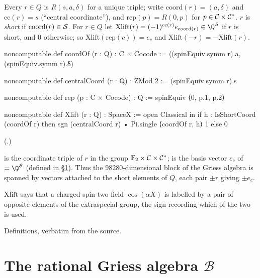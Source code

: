 \begin{definition}\label{ch21:def:Xlift}
Every $r\in Q$ is $R(s,a,\delta)$ for a unique triple; write $\mathrm{coord}(r)=(a,\delta)$ and
$\mathrm{cc}(r)=s$ (``central coordinate''), and $\mathrm{rep}(p)=R(0,p)$ for $p\in\mathcal{C}\times\mathcal{C}^*$.
$r$ is \emph{short} if $\mathrm{coord}(r)\in\mathcal{S}$.  For $r\in Q$ let
$\mathrm{Xlift}(r)=(-1)^{\mathrm{cc}(r)}e_{\mathrm{coord}(r)}\in\Q^{\chXXIS}$ if $r$ is short, and $0$
otherwise; so $\mathrm{Xlift}(\mathrm{rep}(c))=e_c$ and $\mathrm{Xlift}(-r)=-\mathrm{Xlift}(r)$.
\end{definition}
\begin{leancode}
noncomputable def coordOf (r : Q) : C × Cocode :=
  ((spinEquiv.symm r).a, (spinEquiv.symm r).δ)

noncomputable def centralCoord (r : Q) : ZMod 2 := (spinEquiv.symm r).s
\end{leancode}
\begin{leancode}
noncomputable def rep (p : C × Cocode) : Q := spinEquiv ⟨0, p.1, p.2⟩
\end{leancode}
\begin{leancode}
noncomputable def Xlift (r : Q) : SpaceX :=
  open Classical in
  if h : IsShortCoord (coordOf r) then sgn (centralCoord r) • Pi.single ⟨coordOf r, h⟩ 1 else 0
\end{leancode}
(.)
\begin{dictionary}
 is the coordinate triple of $r$ in the group
$\mathbb{F}_2\times\mathcal{C}\times\mathcal{C}^*$;  is the basis vector $e_c$ of
 $=\Q^{\chXXIS}$ (defined in \S\ref{ch21:sec:spaceB}).  Thus the $98280$-dimensional
block of the Griess algebra is spanned by vectors attached to the short elements of $Q$, each pair
$\pm r$ giving $\pm e_c$.
\end{dictionary}
\begin{physics}
$\mathrm{Xlift}$ says that a charged spin-two field $\cos(\alpha X)$ is labelled by a pair of opposite
elements of the extraspecial group, the sign recording which of the two is used.
\end{physics}
\begin{status}
Definitions, verbatim from the source.
\end{status}

\section{The rational Griess algebra \texorpdfstring{$\mathcal B$}{B}}\label{ch21:sec:spaceB}

